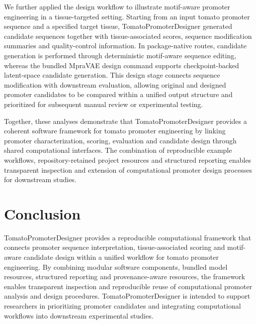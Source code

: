 \documentclass[numsec,webpdf,modern,large]{oup-authoring-template}
\begin{document}
We further applied the design workflow to illustrate motif-aware promoter engineering in a tissue-targeted setting. Starting from an input tomato promoter sequence and a specified target tissue, TomatoPromoterDesigner generated candidate sequences together with tissue-associated scores, sequence modification summaries and quality-control information. In package-native routes, candidate generation is performed through deterministic motif-aware sequence editing, whereas the bundled MpraVAE design command supports checkpoint-backed latent-space candidate generation. This design stage connects sequence modification with downstream evaluation, allowing original and designed promoter candidates to be compared within a unified output structure and prioritized for subsequent manual review or experimental testing.

Together, these analyses demonstrate that TomatoPromoterDesigner provides a coherent software framework for tomato promoter engineering by linking promoter characterization, scoring, evaluation and candidate design through shared computational interfaces. The combination of reproducible example workflows, repository-retained project resources and structured reporting enables transparent inspection and extension of computational promoter design processes for downstream studies.

\section{Conclusion}

TomatoPromoterDesigner provides a reproducible computational framework that connects promoter sequence interpretation, tissue-associated scoring and motif-aware candidate design within a unified workflow for tomato promoter engineering. By combining modular software components, bundled model resources, structured reporting and provenance-aware resources, the framework enables transparent inspection and reproducible reuse of computational promoter analysis and design procedures. TomatoPromoterDesigner is intended to support researchers in prioritizing promoter candidates and integrating computational workflows into downstream experimental studies.



\end{document}

